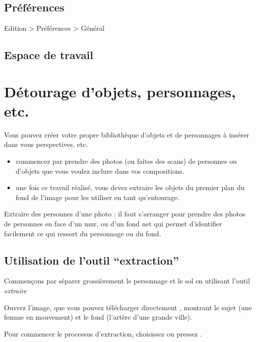 \documentclass[a4paper,12pt,french]{sphinxmanual}
\begin{document}
\subsection{Préférences}
\label{psd/config_psd:preferences}
Edition \textgreater{} Préférences \textgreater{} Général


\subsection{Espace de travail}
\label{psd/config_psd:espace-de-travail}

\section{Détourage d'objets, personnages, etc.}
\label{psd/detourage:detourage-d-objets-personnages-etc}\label{psd/detourage::doc}
Vous pouvez créer votre propre bibliothèque d'objets et de personnages à insérer dans vous perspectives, etc.
\begin{itemize}
\item {} 
commencez par prendre des photos (ou faites des scans) de personnes ou d'objets que vous voulez inclure dans vos compositions.

\item {} 
une fois ce travail réalisé, vous devez extraire les objets du premier plan du fond de l'image pour les utiliser en tant qu'entourage.

\end{itemize}

Extraire des personnes d'une photo : il faut s'arranger pour prendre des photos de personnes en face d'un mur, ou d'un fond net qui permet d'identifier facilement ce qui ressort du personnage ou du fond.


\subsection{Utilisation de l'outil ``extraction''}
\label{psd/detourage:utilisation-de-l-outil-extraction}
Commençons par séparer grossièrement le personnage et le sol en utilisant l'outil \emph{extraire}

Ouvrez l'image, que vous pouvez télécharger directement  , montrant le sujet (une femme en mouvement) et le fond (l'artère d'une grande ville).

Pour commencer le processus d'extraction, choisissez  ou pressez .
\end{document}
